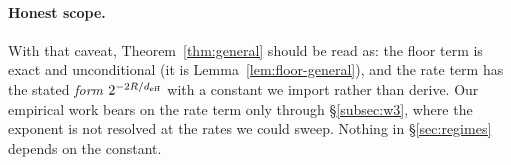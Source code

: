 \paragraph{Honest scope.} With that caveat, Theorem~\ref{thm:general} should
be read as: the floor term is exact and unconditional (it is
Lemma~\ref{lem:floor-general}), and the rate term has the stated
\emph{form} $2^{-2R/d_{\mathrm{eff}}}$ with a constant we import rather than derive. Our
empirical work bears on the rate term only through
\S\ref{subsec:w3}, where the exponent is not resolved at the rates we could
sweep. Nothing in \S\ref{sec:regimes} depends on the constant.
